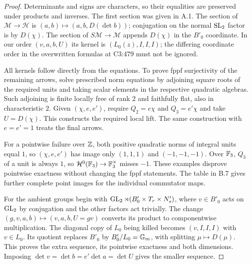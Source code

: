 \begin{proof}
Determinants and signs are characters, so their equalities are
preserved under products and inverses. The first section was
given in A.1. The section of $\mathcal M\to\mathcal H$ is
$(a,b)\mapsto(a,b,D(\det b))$; conjugation on the normal
$\operatorname{SL}_2$ factor is by $D(\chi)$. The section of
$S\mathcal M\to\mathcal M$ appends $D(\chi)$ in the
$B'_0$ coordinate. In our order $(v,a,b,U)$ its kernel is
$(L_0(z),I,I,I)$; the differing coordinate order in the
overwritten formulas at C3:479 must not be ignored.

All kernels follow directly from the equations. To prove
fppf surjectivity of the remaining arrows, solve prescribed
norm equations by adjoining square roots of the required
units and taking scalar elements in the respective quadratic
algebras. Such adjoining is finite locally free of rank $2$
and faithfully flat, also in characteristic $2$. Given
$(\chi,e,e')$, require $Q_2=e\chi$ and $Q_3=e'\chi$ and
take $U=D(\chi)$. This constructs the required local lift.
The same construction with $e=e'=1$ treats the final arrows.

For a pointwise failure over $\mathbb Z$, both positive quadratic
norms of integral units equal $1$, so
$(\chi,e,e')$ has image only $(1,1,1)$ and $(-1,-1,-1)$.
Over $\mathbb F_3$, $Q_3$ of a unit is always $1$, so
$\mathcal H^0(\mathbb F_3)\to\mathbb F_3^\times$ misses $-1$.
These examples disprove pointwise exactness without changing
the fppf statements. The table in B.7 gives further complete
point images for the individual commutator maps.

For the ambient groups begin with
$\operatorname{GL}_2\rtimes(B'_0\times T_r\times N'_s)$, where $v\in B'_0$
acts on $\operatorname{GL}_2$ by conjugation and the other factors act trivially.
The change $(g,v,a,b)\mapsto(v,a,b,U=gv)$ converts its product
to componentwise multiplication. The diagonal copy of $L_0$
being killed becomes $(v,I,I,I)$ with $v\in L_0$.
Its quotient replaces $B'_0$ by $B'_0/L_0=\mathbb G_m$, with splitting
$\mu\mapsto D(\mu)$. This proves the extra sequence, its pointwise
exactness and both dimensions. Imposing
$\det v=\det b=e'\det a=\det U$ gives the smaller sequence.
\end{proof}

